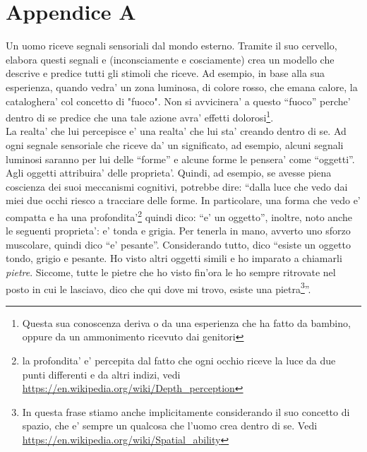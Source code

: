 \section{Appendice A}
\label{menteCrea}

Un uomo riceve segnali sensoriali dal mondo esterno. Tramite il suo cervello, elabora questi segnali e (inconsciamente e cosciamente) crea un modello che descrive e predice tutti gli stimoli che riceve. Ad esempio, in base alla sua esperienza, quando vedra' un zona luminosa, di colore rosso, che emana calore, la cataloghera' col concetto di "fuoco". Non si avvicinera' a questo ``fuoco'' perche' dentro di se predice che una tale azione avra' effetti dolorosi\footnote{Questa sua conoscenza deriva o da una esperienza che ha fatto da bambino, oppure da un ammonimento ricevuto dai genitori}.\\
La realta' che lui percepisce e' una realta' che lui sta' creando dentro di se. Ad ogni segnale sensoriale che riceve da' un significato, ad esempio, alcuni segnali luminosi saranno per lui delle ``forme'' e alcune forme le pensera' come ``oggetti''. Agli oggetti attribuira' delle proprieta'.  Quindi, ad esempio, se avesse piena coscienza dei suoi meccanismi cognitivi, potrebbe dire: ``dalla luce che vedo dai miei due occhi riesco a tracciare delle forme. In particolare, una forma che vedo e' compatta e ha una profondita'\footnote{la profondita' e' percepita dal fatto che ogni occhio riceve la luce da due punti differenti e da altri indizi, vedi \url{https://en.wikipedia.org/wiki/Depth\_perception}} quindi dico: ``e' un oggetto'', inoltre, noto anche le seguenti proprieta': e' tonda e grigia. Per tenerla in mano, avverto uno sforzo muscolare, quindi dico ``e' pesante''. Considerando tutto, dico ``esiste un oggetto tondo, grigio e pesante. Ho visto altri oggetti simili e ho imparato a chiamarli \emph{pietre}. Siccome, tutte le pietre che ho visto fin'ora le ho sempre ritrovate nel posto in cui le lasciavo, dico che qui dove mi trovo, esiste una pietra\footnote{In questa frase stiamo anche implicitamente considerando il suo concetto di spazio, che e' sempre un qualcosa che l'uomo crea dentro di se. Vedi \url{https://en.wikipedia.org/wiki/Spatial\_ability}}''.\\




